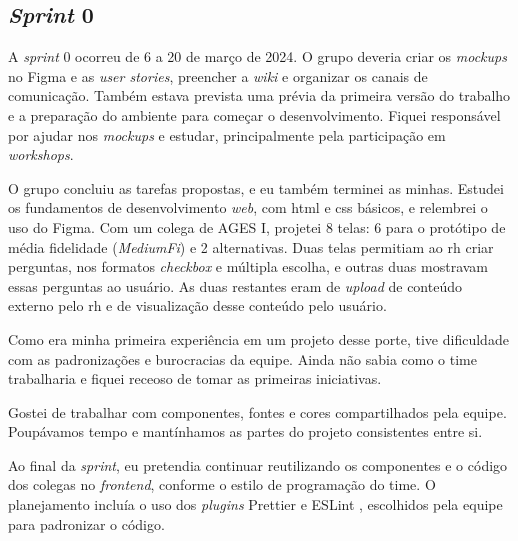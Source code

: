 \subsection{\textit{Sprint} 0}

A \textit{sprint} 0 ocorreu de 6 a 20 de março de 2024. O grupo deveria criar os \textit{mockups} no Figma
\cite{figma-help} e as \textit{user stories}, preencher a \textit{wiki} e organizar
os canais de comunicação. Também estava prevista uma prévia da primeira versão
do trabalho e a preparação do ambiente para começar o desenvolvimento. Fiquei
responsável por ajudar nos \textit{mockups} e estudar, principalmente pela
participação em \textit{workshops}.

O grupo concluiu as tarefas propostas, e eu também terminei as minhas. Estudei
os fundamentos de desenvolvimento \textit{web}, com \ac{html} e \ac{css} básicos,
e relembrei o uso do Figma. Com um colega de AGES I, projetei 8 telas: 6 para o
protótipo de média fidelidade (\textit{MediumFi}) e 2 alternativas. Duas telas permitiam ao \ac{rh} criar perguntas, nos formatos
\textit{checkbox} e múltipla escolha, e outras duas mostravam essas perguntas ao
usuário. As duas restantes eram de \textit{upload} de conteúdo externo pelo
\ac{rh} e de visualização desse conteúdo pelo usuário.

Como era minha primeira experiência em um projeto desse porte, tive dificuldade
com as padronizações e burocracias da equipe. Ainda não sabia como o time
trabalharia e fiquei receoso de tomar as primeiras iniciativas.

Gostei de trabalhar com componentes, fontes e cores compartilhados pela
equipe. Poupávamos tempo e mantínhamos as partes do projeto consistentes
entre si.

Ao final da \textit{sprint}, eu pretendia continuar reutilizando os componentes
e o código dos colegas no \textit{frontend}, conforme o estilo de programação do
time. O planejamento incluía o uso dos \textit{plugins} Prettier
\cite{prettier-docs} e ESLint \cite{eslint-docs}, escolhidos pela equipe para
padronizar o código.

